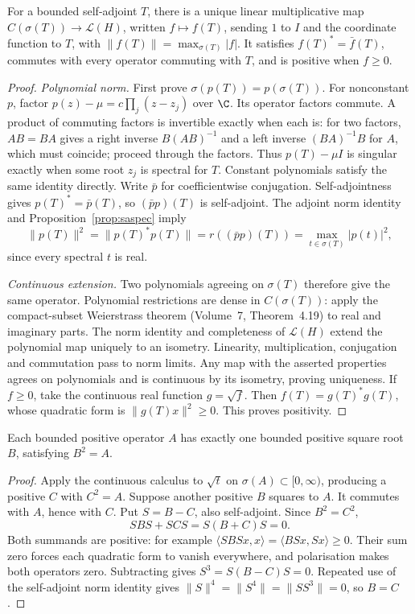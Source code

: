\begin{theorem}\label{thm:funcalc}
For a bounded self-adjoint $T$, there is a unique linear multiplicative map $C(\sigma(T))\to\mathcal L(H)$, written $f\mapsto f(T)$, sending $1$ to $I$ and the coordinate function to $T$, with
$\|f(T)\|=\max_{\sigma(T)}|f|$.
It satisfies $f(T)^*=\bar f(T)$, commutes with every operator commuting with $T$, and is positive when $f\ge0$.
\end{theorem}
\begin{proof}
\emph{Polynomial norm.} First prove $\sigma(p(T))=p(\sigma(T))$. For nonconstant $p$, factor $p(z)-\mu=c\prod_j(z-z_j)$ over $\C$. Its operator factors commute. A product of commuting factors is invertible exactly when each is: for two factors, $AB=BA$ gives a right inverse $B(AB)^{-1}$ and a left inverse $(BA)^{-1}B$ for $A$, which must coincide; proceed through the factors. Thus $p(T)-\mu I$ is singular exactly when some root $z_j$ is spectral for $T$. Constant polynomials satisfy the same identity directly.
Write $\bar p$ for coefficientwise conjugation. Self-adjointness gives $p(T)^*=\bar p(T)$, so $(\bar pp)(T)$ is self-adjoint. The adjoint norm identity and Proposition~\ref{prop:saspec} imply
\[
\|p(T)\|^2=\|p(T)^*p(T)\|
=r((\bar pp)(T))=\max_{t\in\sigma(T)}|p(t)|^2,
\]
since every spectral $t$ is real.

\emph{Continuous extension.} Two polynomials agreeing on $\sigma(T)$ therefore give the same operator. Polynomial restrictions are dense in $C(\sigma(T))$: apply the compact-subset Weierstrass theorem (Volume~7, Theorem~4.19) to real and imaginary parts. The norm identity and completeness of $\mathcal L(H)$ extend the polynomial map uniquely to an isometry. Linearity, multiplication, conjugation and commutation pass to norm limits. Any map with the asserted properties agrees on polynomials and is continuous by its isometry, proving uniqueness.
If $f\ge0$, take the continuous real function $g=\sqrt f$. Then $f(T)=g(T)^*g(T)$, whose quadratic form is $\|g(T)x\|^2\ge0$. This proves positivity.
\end{proof}

\begin{corollary}\label{cor:sqrt}
Each bounded positive operator $A$ has exactly one bounded positive square root $B$, satisfying $B^2=A$.
\end{corollary}
\begin{proof}
Apply the continuous calculus to $\sqrt t$ on $\sigma(A)\subset[0,\infty)$, producing a positive $C$ with $C^2=A$. Suppose another positive $B$ squares to $A$. It commutes with $A$, hence with $C$. Put $S=B-C$, also self-adjoint. Since $B^2=C^2$,
\[
SBS+SCS=S(B+C)S=0.
\]
Both summands are positive: for example $\langle SBSx,x\rangle=\langle BSx,Sx\rangle\ge0$. Their sum zero forces each quadratic form to vanish everywhere, and polarisation makes both operators zero. Subtracting gives $S^3=S(B-C)S=0$. Repeated use of the self-adjoint norm identity gives
$\|S\|^4=\|S^4\|=\|SS^3\|=0$,
so $B=C$.
\end{proof}

